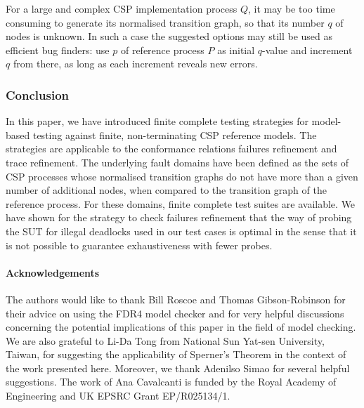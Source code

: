 For a large and complex CSP implementation process $Q$, it may be too time consuming to
generate its normalised transition graph, so that its number $q$ of nodes is
unknown. In such a case the suggested options may still be used as efficient
bug finders: use  $p$ of reference process $P$ as initial $q$-value and
increment $q$ from there, as long as each increment reveals new errors.

\subsubsection*{Conclusion}

In this paper, we have introduced finite complete testing strategies for
model-based testing against finite, non-terminating CSP reference models. The
strategies are applicable to the conformance relations failures refinement
and trace refinement. The underlying fault domains have been defined as the
sets of CSP processes whose normalised transition graphs do not have more
than a given number of additional nodes, when compared to the transition
graph of the reference process. For these domains, finite complete test
suites are available. We have shown for the strategy to check failures
refinement that the way of probing the SUT for illegal deadlocks used in our
test cases is optimal in the sense that it is not possible to guarantee
exhaustiveness with fewer probes.


\paragraph{Acknowledgements}
The authors would like to thank Bill Roscoe and Thomas Gibson-Robinson for
their advice on using the FDR4 model checker and for very helpful discussions
concerning the potential implications of this paper in the field of model
checking. We are also grateful to Li-Da Tong from National Sun Yat-sen
University, Taiwan, for suggesting the applicability of Sperner's Theorem in
the context of the work presented here. Moreover, we thank Adenilso Simao for
several helpful suggestions. The work of Ana Cavalcanti is funded by the
Royal Academy of Engineering and UK EPSRC Grant EP/R025134/1.
